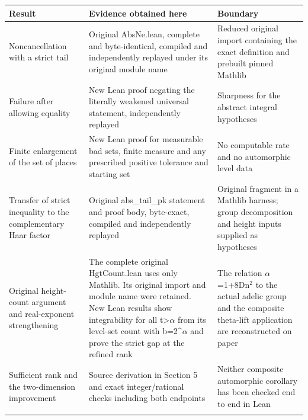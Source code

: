 \documentclass[11pt,letterpaper]{article}
\begin{document}
{\small
\begin{longtable}{@{}>{\raggedright\arraybackslash}p{0.24\dimexpr\linewidth-4\tabcolsep\relax}>{\raggedright\arraybackslash}p{0.38\dimexpr\linewidth-4\tabcolsep\relax}>{\raggedright\arraybackslash}p{0.38\dimexpr\linewidth-4\tabcolsep\relax}@{}}
\toprule
\textbf{Result} & \textbf{Evidence obtained here} & \textbf{Boundary}\\\midrule\endhead
Noncancellation with a strict tail & Original {\ttfamily\small AbsNe.\allowbreak{}lean}, complete and byte-identical, compiled and independently replayed under its original module name & Reduced original import containing the exact definition and prebuilt pinned Mathlib\\\addlinespace[4pt]
Failure after allowing equality & New Lean proof negating the literally weakened universal statement, independently replayed & Sharpness for the abstract integral hypotheses\\\addlinespace[4pt]
Finite enlargement of the set of places & New Lean proof for measurable bad sets, finite measure and any prescribed positive tolerance and starting set & No computable rate and no automorphic level data\\\addlinespace[4pt]
Transfer of strict inequality to the complementary Haar factor & Original {\ttfamily\small abs\_\allowbreak{}tail\_\allowbreak{}pk} statement and proof body, byte-exact, compiled and independently replayed & Original fragment in a Mathlib harness; group decomposition and height inputs supplied as hypotheses\\\addlinespace[4pt]
Original height-count argument and real-exponent strengthening & The complete original {\ttfamily\small HgtCount.\allowbreak{}lean} uses only Mathlib. Its original import and module name were retained. New Lean results show integrability for all t>\ensuremath{\alpha} from its level-set count with b=2\textasciicircum{}\ensuremath{\alpha} and prove the strict gap at the refined rank & The relation \ensuremath{\alpha}=1+8Dn\ensuremath{{}^{2}} to the actual adelic group and the composite theta-lift application are reconstructed on paper\\\addlinespace[4pt]
Sufficient rank and the two-dimension improvement & Source derivation in Section 5 and exact integer/rational checks including both endpoints & Neither composite automorphic corollary has been checked end to end in Lean\\\addlinespace[4pt]
\bottomrule\end{longtable}}
\end{document}
